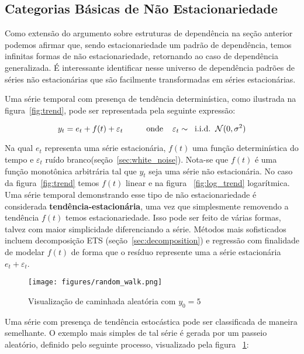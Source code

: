 \subsection{Categorias Básicas de Não Estacionariedade}\label{ssec:taxonomy}

Como extensão do argumento sobre estruturas de dependência na seção anterior
podemos afirmar que, sendo estacionariedade um padrão de dependência, temos
infinitas formas de não estacionariedade, retornando ao caso de dependência
generalizada. É interessante identificar nesse universo de dependência padrões
de séries não estacionárias que são facilmente transformadas em séries
estacionárias.

Uma série temporal com presença de tendência determinística, como ilustrada na
figura~\ref{fig:trend}, pode ser representada pela seguinte expressão:

$$  y_t = e_t + f(t) + \varepsilon_t  \hspace{1cm}\text{onde} \hspace{.4cm}\varepsilon_t \sim \hspace{.2cm}\text{i.i.d.} \hspace{.2cm}\mathcal{N}(0, \sigma^2)$$

Na qual $e_t$ representa uma série estacionária, $f(t)$ uma função
determinística do tempo e $\varepsilon_t$ ruído
branco(seção~\ref{sec:white_noise}). Nota-se que $f(t)$ é uma função
monotônica arbitrária tal que $y_t$ seja uma série não estacionária. No caso da
figura~\ref{fig:trend} temos $f(t)$ linear e na figura ~\ref{fig:log_trend}
logarítmica. Uma série temporal demonstrando esse tipo de não estacionariedade
é considerada \textbf{tendência-estacionária}, uma vez que simplesmente
removendo a tendência $f(t)$ temos estacionariedade. Isso pode ser feito de
várias formas, talvez com maior simplicidade diferenciando a série. Métodos
mais sofisticados incluem decomposição ETS (seção~\ref{sec:decomposition}) e
regressão com finalidade de modelar $f(t)$ de forma que o resíduo represente
uma a série estacionária $e_t + \varepsilon_t$.

\begin{figure}[h]
    \centering
    \texttt{[image: figures/random\_walk.png]}
    \caption{Visualização de caminhada aleatória com $y_0=5$}
    \label{fig:random_walk}
\end{figure}

Uma série com presença de tendência estocástica pode ser classificada de
maneira semelhante. O exemplo mais simples de tal série é gerada por um
passeio aleatório, definido pelo seguinte processo, visualizado pela figura
~\ref{fig:random_walk}:

